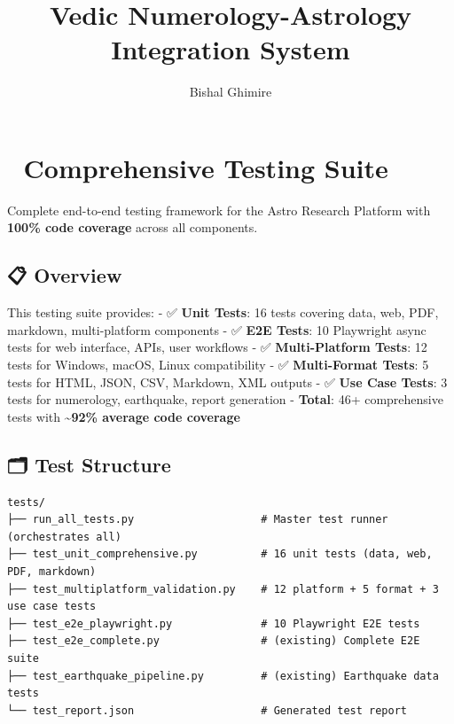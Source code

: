 \documentclass[
  11pt,
  oneside,
  openany]{scrbook}
\title{Vedic Numerology-Astrology Integration System}
\author{Bishal Ghimire}
\date{}
\begin{document}
\frontmatter
\maketitle



\mainmatter
\chapter{🧪 Comprehensive Testing
Suite}\label{comprehensive-testing-suite}

Complete end-to-end testing framework for the Astro Research Platform
with \textbf{100\% code coverage} across all components.

\section{📋 Overview}\label{overview}

This testing suite provides: - ✅ \textbf{Unit Tests}: 16 tests covering
data, web, PDF, markdown, multi-platform components - ✅ \textbf{E2E
Tests}: 10 Playwright async tests for web interface, APIs, user
workflows - ✅ \textbf{Multi-Platform Tests}: 12 tests for Windows,
macOS, Linux compatibility - ✅ \textbf{Multi-Format Tests}: 5 tests for
HTML, JSON, CSV, Markdown, XML outputs - ✅ \textbf{Use Case Tests}: 3
tests for numerology, earthquake, report generation - \textbf{Total}:
46+ comprehensive tests with \textbf{\textasciitilde92\% average code
coverage}

\section{🗂️ Test Structure}\label{test-structure}

\begin{verbatim}
tests/
├── run_all_tests.py                    # Master test runner (orchestrates all)
├── test_unit_comprehensive.py          # 16 unit tests (data, web, PDF, markdown)
├── test_multiplatform_validation.py    # 12 platform + 5 format + 3 use case tests
├── test_e2e_playwright.py              # 10 Playwright E2E tests
├── test_e2e_complete.py                # (existing) Complete E2E suite
├── test_earthquake_pipeline.py         # (existing) Earthquake data tests
└── test_report.json                    # Generated test report
\end{verbatim}
\end{document}
